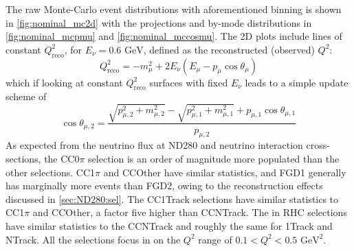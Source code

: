 \iffalse
The raw Monte-Carlo \pmu \cosmu event distributions with aforementioned binning is shown in \autoref{fig:nominal_mc2d} with the projections and by-mode distributions in \autoref{fig:nominal_mcpmu} and \autoref{fig:nominal_mccosmu}. The 2D plots include lines of constant $Q^2_{\text{reco}}$, for $E_\nu = 0.6 \text{ GeV}$, defined as the reconstructed (observed) $Q^2$:
\begin{equation}
Q^2_{\text{reco}} = -m^2_\mu + 2E_\nu \left( E_\mu-p_\mu\cos\theta_\mu \right)
\end{equation}
which if looking at constant $Q^2_{\text{reco}}$ surfaces with fixed $E_\nu$ leads to a simple update scheme of
\begin{equation}
\cos\theta_{\mu, 2} = \frac{\sqrt{p_{\mu,2}^2+m_{\mu,2}^2} - \sqrt{p_{\mu,1}^2+m_{\mu,1}^2}+p_{\mu,1}\cos\theta_{\mu,1}}{p_{\mu,2}}
\end{equation}
As expected from the neutrino flux at ND280 and neutrino interaction cross-sections, the CC0$\pi$ selection is an order of magnitude more populated than the other \numu selections. CC1$\pi$ and CCOther have similar statistics, and FGD1 generally has marginally more events than FGD2, owing to the reconstruction effects discussed in \autoref{sec:ND280:sel}. The \numubar CC1Track selections have similar statistics to \numu CC1$\pi$ and CCOther, a factor five higher than \numubar CCNTrack. The \numu in RHC selections have similar statistics to the \numubar CCNTrack and roughly the same for 1Track and NTrack. All the selections focus in on the $Q^2$ range of $0.1 < Q^2 < 0.5 \text{ GeV}^2$.
